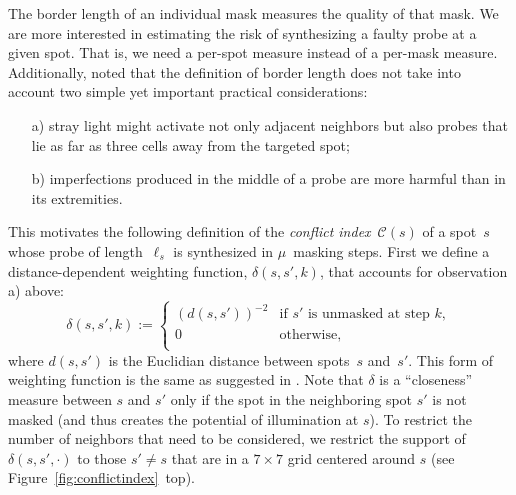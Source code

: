 \documentclass{bioinfo}
\begin{document}
The border length of an individual mask measures the quality of that
mask. We are more interested in estimating the risk of synthesizing a faulty
probe at a given spot. That is, we need a per-spot measure
instead of a per-mask measure. Additionally, \citet{KAHNG03A} noted
that the definition of border length does not take into account two
simple yet important practical considerations:
\begin{itemize}
\item[a)] stray light might activate not only adjacent neighbors but
  also probes that lie as far as three cells away from the targeted
  spot;
\item[b)] imperfections produced in the middle of a probe are more
  harmful than in its extremities.
\end{itemize}
This motivates the following definition of the \emph{conflict
  index}~$\mathcal{C}(s)$ of a spot~$s$ whose probe of
length~$\ell_{s}$ is synthesized in $\mu$~masking steps. First we
define a distance-dependent weighting function, $\delta(s,s',k)$, that
accounts for observation a) above:
\begin{equation}
\label{eq:dist_weight}
\delta(s,s',k) :=
        \left\{
                \begin{array}{ll}
                        (d(s,s'))^{-2} & \mbox{if $s'$ is unmasked at step $k$}, \\
                        0 & \mbox{otherwise}, \\
                \end{array}
        \right.
\end{equation}
where $d(s,s')$ is the Euclidian distance between spots~$s$ and~$s'$.
This form of weighting function is the same as suggested in
\citet{KAHNG03A}.  Note that $\delta$ is a ``closeness'' measure
between $s$ and $s'$ only if the spot in the neighboring spot $s'$ is
not masked (and thus creates the potential of illumination at $s$). To
restrict the number of neighbors that need to be considered, we
restrict the support of $\delta(s,s',\cdot)$ to those $s'\neq s$ that
are in a $7\times 7$ grid centered around $s$ (see
Figure~\ref{fig:conflictindex}~top).
\end{document}
